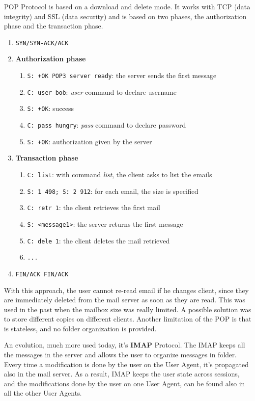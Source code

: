 POP Protocol is based on a download and delete mode. It works with TCP (data integrity) and SSL (data security) and is based on two phases, the authorization phase and the transaction phase.
\begin{enumerate}
    \item \texttt{SYN/SYN-ACK/ACK}
    \item \textbf{Authorization phase}
    \begin{enumerate}
        \item \texttt{S: +OK POP3 server ready}: the server sends the first message
        \item \texttt{C: user bob}: \textit{user} command to declare username
        \item \texttt{S: +OK}: success
        \item \texttt{C: pass hungry}: \textit{pass} command to declare password
        \item \texttt{S: +OK}: authorization given by the server
    \end{enumerate}
    \item \textbf{Transaction phase}
    \begin{enumerate}
        \item \texttt{C: list}: with command \textit{list}, the client asks to list the emails
        \item \texttt{S: 1 498; S: 2 912}: for each email, the size is specified
        \item \texttt{C: retr 1}: the client retrieves the first mail
        \item \texttt{S: <message1>}: the server returns the first message
        \item \texttt{C: dele 1}: the client deletes the mail retrieved
        \item \texttt{...}
    \end{enumerate}
    \item \texttt{FIN/ACK FIN/ACK}
\end{enumerate}

\noindent With this approach, the user cannot re-read email if he changes client, since they are immediately deleted from the mail server as soon as they are read. This was used in the past when the mailbox size was really limited. A possible solution was to store different copies on different clients. Another limitation of the POP is that is stateless, and no folder organization is provided.

An evolution, much more used today, it's \textbf{IMAP} Protocol. The IMAP keeps all the messages in the server and allows the user to organize messages in folder. Every time a modification is done by the user on the User Agent, it's propagated also in the mail server. As a result, IMAP keeps the user state across sessions, and the modifications done by the user on one User Agent, can be found also in all the other User Agents.

